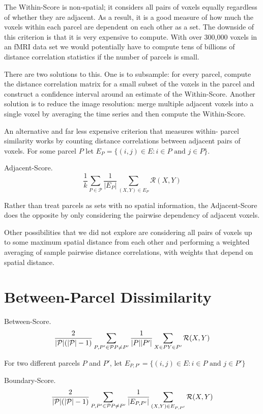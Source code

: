 The Within-Score is non-spatial; it considers all pairs of voxels
equally regardless of whether they are adjacent. As a result, it is a
good measure of how much the voxels within each parcel are dependent on
each other as a set. The downside of this criterion is that it is very
expensive to compute. With over 300,000 voxels in an fMRI data set we
would potentially have to compute tens of billions of distance
correlation statistics if the number of parcels is small.

There are two solutions to this. One is to subsample: for every parcel,
compute the distance correlation matrix for a small subset of the voxels
in the parcel and construct a confidence interval around an estimate of
the Within-Score. Another solution is to reduce the image resolution:
merge multiple adjacent voxels into a single voxel by averaging the time
series and then compute the Within-Score.

An alternative and far less expensive criterion that measures within-
parcel similarity works by counting distance correlations between
adjacent pairs of voxels. For some parcel $P$ let
$E_P = \{ (i,j) \in E : i \in P \text{ and } j \in P \}$.

\begin{definition} \label{adjacent-score}
Adjacent-Score.
\[ \frac{1}{k} \sum_{P \in \mathcal{P}}
   \frac{1}{|E_P|} \sum_{(X,Y) \in E_P} \mathcal{R}(X,Y)
\]
\end{definition}

Rather than treat parcels as sets with no spatial information, the
Adjacent-Score does the opposite by only considering the pairwise
dependency of adjacent voxels.

Other possibilities that we did not explore are considering all pairs
of voxels up to some maximum spatial distance from each other and
performing a weighted averaging of sample pairwise distance
correlations, with weights that depend on spatial distance.

\section{Between-Parcel Dissimilarity}

\begin{definition} \label{between-score}
Between-Score.
\[ \frac{2}{|\mathcal{P}|(|\mathcal{P}| - 1)}
     \sum_{P, P' \in \mathcal{P} \\ P \neq P'}
   \frac{1}{|P| |P'|} \sum_{X \in P \\ Y \in P'} \mathcal{R}(X,Y)
\]
\end{definition}

For two different parcels $P$ and $P'$, let
$E_{P,P'} = \{ (i,j) \in E : i \in P \text{ and } j \in P' \}$

\begin{definition} \label{boundary-score}
Boundary-Score.
\[ \frac{2}{|\mathcal{P}|(|\mathcal{P}| - 1)}
     \sum_{P, P' \in \mathcal{P} \\ P \neq P'}
   \frac{1}{|E_{P,P'}|} \sum_{(X,Y) \in E_{P,P'}} \mathcal{R}(X,Y)
\]
\end{definition}

